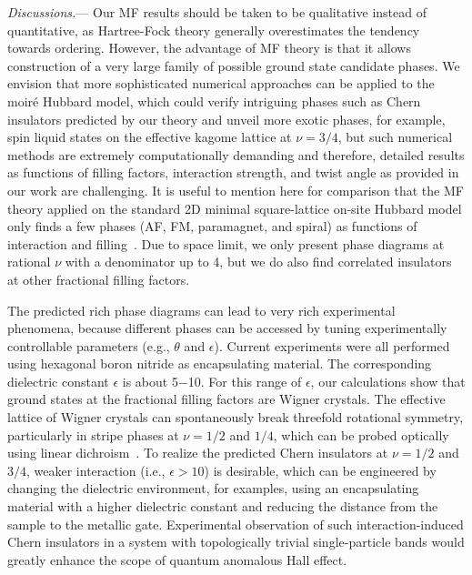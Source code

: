 \documentclass[aps,prl,floatfix,twocolumn]{revtex4-1}
\begin{document}
\textit{Discussions.}--- Our MF results should be taken to be qualitative instead of quantitative, as Hartree-Fock theory generally overestimates the tendency towards ordering. However, the advantage of MF theory is that it allows construction of a very large family of possible ground state candidate phases.  We envision that more sophisticated numerical approaches can be applied to the moir\'e Hubbard model, which could verify intriguing phases such as Chern insulators predicted by our theory and unveil more exotic phases, for example, spin liquid states on the effective kagome lattice at $\nu=3/4$, but such numerical methods are extremely computationally demanding and therefore, detailed results as functions of filling factors, interaction strength, and twist angle as provided in our work are challenging.  It is useful to mention here for comparison that the MF theory applied on the standard 2D minimal square-lattice on-site Hubbard model only finds a few phases (AF, FM, paramagnet, and spiral) as functions of interaction and filling~\cite{hirsch1985twodimensional,igoshev2015spiral}. Due to space limit, we only present phase diagrams at rational $\nu$ with a denominator up to 4, but we do also find correlated insulators at other fractional filling factors.

The predicted rich phase diagrams can lead to very rich experimental phenomena, because different phases can be accessed by tuning experimentally controllable parameters (e.g., $\theta$ and $\epsilon$).   Current experiments \cite{regan2020mott,tang2020simulation,wang2020correlated,jin2020stripe,xu2020abundance,huang2020correlated} were all performed using hexagonal boron nitride as encapsulating material. The corresponding dielectric constant $\epsilon$ is about 5$-$10.  For this range of $\epsilon$, our calculations show that ground states at the fractional filling factors are Wigner crystals. The effective lattice of Wigner crystals can spontaneously break threefold rotational symmetry, particularly in stripe phases at $\nu=1/2$ and $1/4$, which can be probed optically using linear dichroism~\cite{jin2020stripe}. To realize the predicted Chern insulators at $\nu=1/2$ and $3/4$, weaker interaction (i.e., $\epsilon>10$) is desirable, which can be engineered by changing the dielectric environment, for examples, using an encapsulating material with a higher dielectric constant and reducing the distance from the sample to the metallic gate. Experimental observation of such interaction-induced Chern insulators in a system with topologically trivial single-particle bands would greatly enhance the scope of quantum anomalous Hall effect.  
\end{document}
